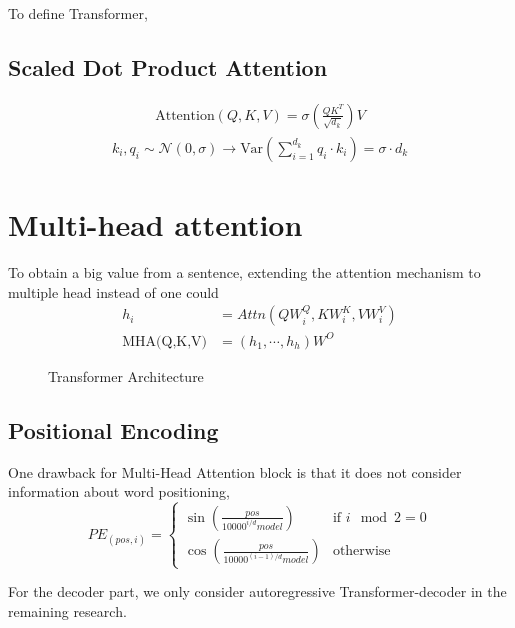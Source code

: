 To define Transformer,
\subsection{Scaled Dot Product Attention}
\begin{align*}
\text{Attention}(Q,K,V) = \sigma\left(\frac{QK^T}{\sqrt{d_k}}\right)V
\end{align*}
\begin{align*}
k_i, q_i\sim\mathcal{N}(0,\sigma)\rightarrow\text{Var}\left(\sum_{i=1}^{d_k}q_i\cdot k_i\right)=\sigma\cdot d_k
\end{align*}
\section{Multi-head attention}
To obtain a big value from a sentence, extending the attention mechanism to multiple head instead of one could 
\begin{align*}
h_i&=Attn(QW_i^Q,KW_i^K,VW_i^V)\\
\text{MHA(Q,K,V)}&=(h_1,\cdots,h_h)W^O
\end{align*}
\begin{figure}
\caption{Transformer Architecture}
\label{fig:transformer_arch}
\end{figure}
\subsection{Positional Encoding}
One drawback for Multi-Head Attention block is that it does not consider information about word positioning, 
\[ PE_{(pos,i)} = \begin{cases} 
\sin\left(\frac{pos}{10000^{i/d}model}\right) & \text{if }i \mod 2 = 0 \\
\cos\left(\frac{pos}{10000^{(i-1)/d}model}\right) & \text{otherwise}
       \end{cases}
    \]
    
For the decoder part, we only consider autoregressive Transformer-decoder in the remaining research.